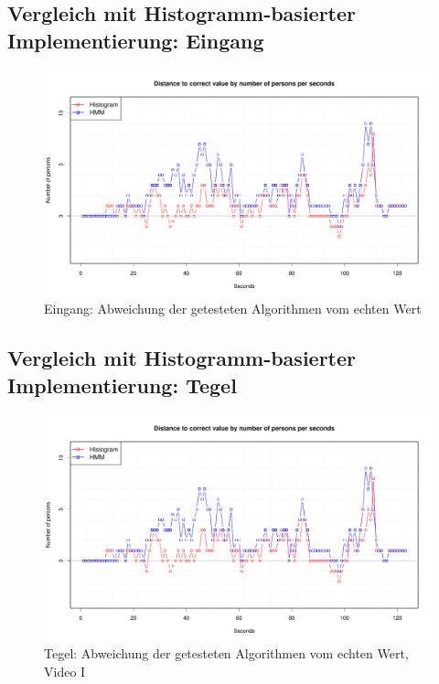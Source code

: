 \subsection{Vergleich mit Histogramm-basierter Implementierung: Eingang}
\label{sec:eval_eingang}
\begin{figure}
	\centering
\includegraphics[width=1\textwidth]{bilder/safest_plot_tegel_7-55.pdf}
	\caption{Eingang: Abweichung der getesteten Algorithmen vom echten Wert}
	\label{fig:Eingang}
\end{figure}

\subsection{Vergleich mit Histogramm-basierter Implementierung: Tegel}
\label{sec:eval:tegel}
\begin{figure}
	\centering
\includegraphics[width=1\textwidth]{bilder/safest_plot_tegel_7-55.pdf}
	\caption{Tegel: Abweichung der getesteten Algorithmen vom echten Wert, Video I}
	\label{fig:tegel_5-29}
\end{figure}

